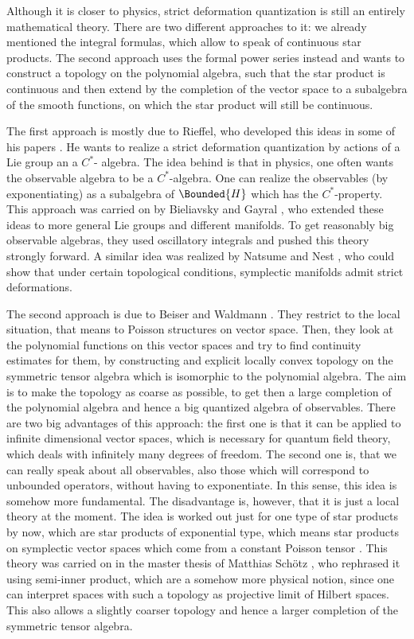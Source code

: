 Although it is closer to physics, strict deformation quantization is still an 
entirely mathematical theory. There are two different approaches to it: we 
already mentioned the integral formulas, which allow to speak of continuous star 
products. The second approach uses the formal power series instead and wants to 
construct a topology on the polynomial algebra, such that the star product is 
continuous and then extend by the completion of the vector space to a subalgebra 
of the smooth functions, on which the star product will still be continuous.


The first approach is mostly due to Rieffel, who developed this ideas in some of 
his papers \cite{rieffel:1989a, rieffel:1990a, rieffel:1993a}. He wants to 
realize a strict deformation quantization by actions of a Lie group an a $C^*$-
algebra. The idea behind is that in physics, one often wants the observable 
algebra to be a $C^*$-algebra. One can realize the observables (by 
exponentiating) as a subalgebra of $\Bounded{H}$ which has the $C^*$-property. 
This approach was carried on by Bieliavsky and Gayral \cite{}, who extended 
these ideas to more general Lie groups and different manifolds. To get 
reasonably big observable algebras, they used oscillatory integrals and pushed 
this theory strongly forward. A similar idea was realized by Natsume and Nest 
\cite{}, who could show that under certain topological conditions, symplectic 
manifolds admit strict deformations.


The second approach is due to Beiser and Waldmann \cite{}. They restrict to the 
local situation, that means to Poisson structures on vector space. Then, they 
look at the polynomial functions on this vector spaces and try to find 
continuity estimates for them, by constructing and explicit locally convex 
topology on the symmetric tensor algebra which is isomorphic to the polynomial 
algebra. The aim is to make the topology as coarse as possible, to get then a 
large completion of the polynomial algebra and hence a big quantized algebra of 
observables. There are two big advantages of this approach: the first one is 
that it can be applied to infinite dimensional vector spaces, which is necessary 
for quantum field theory, which deals with infinitely many degrees of freedom. 
The second one is, that we can really speak about all observables, also those 
which will correspond to unbounded operators, without having to exponentiate. In 
this sense, this idea is somehow more fundamental. The disadvantage is, however, 
that it is just a local theory at the moment. The idea is worked out just for 
one type of star products by now, which are star products of exponential type, 
which means star products on symplectic vector spaces which come from a constant 
Poisson tensor \cite{waldmann:2014a}. This theory was carried on in the master 
thesis of Matthias Sch\"otz \cite{Schoetz:2015a}, who rephrased it using 
semi-inner product, which are a somehow more physical notion, since one can 
interpret spaces with such a topology as projective limit of Hilbert spaces.
This also allows a slightly coarser topology and hence a larger completion of the 
symmetric tensor algebra.


